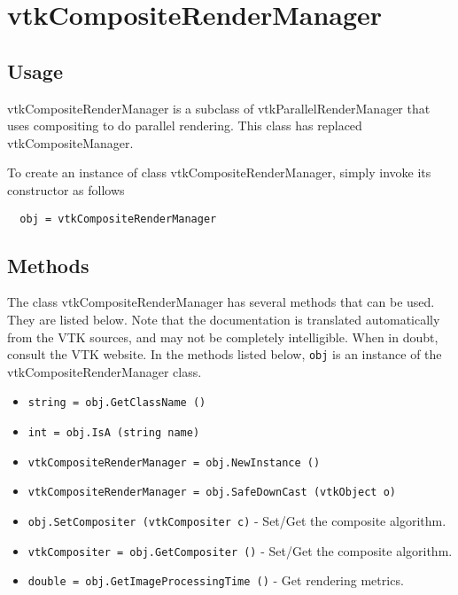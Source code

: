 \section{vtkCompositeRenderManager}

\subsection{Usage}

 vtkCompositeRenderManager is a subclass of vtkParallelRenderManager that
 uses compositing to do parallel rendering.  This class has
 replaced vtkCompositeManager.


To create an instance of class vtkCompositeRenderManager, simply
invoke its constructor as follows
\begin{verbatim}
  obj = vtkCompositeRenderManager
\end{verbatim}
\subsection{Methods}

The class vtkCompositeRenderManager has several methods that can be used.
  They are listed below.
Note that the documentation is translated automatically from the VTK sources,
and may not be completely intelligible.  When in doubt, consult the VTK website.
In the methods listed below, \verb|obj| is an instance of the vtkCompositeRenderManager class.
\begin{itemize}
\item  \verb|string = obj.GetClassName ()|

\item  \verb|int = obj.IsA (string name)|

\item  \verb|vtkCompositeRenderManager = obj.NewInstance ()|

\item  \verb|vtkCompositeRenderManager = obj.SafeDownCast (vtkObject o)|

\item  \verb|obj.SetCompositer (vtkCompositer c)| -  Set/Get the composite algorithm.

\item  \verb|vtkCompositer = obj.GetCompositer ()| -  Set/Get the composite algorithm.

\item  \verb|double = obj.GetImageProcessingTime ()| -  Get rendering metrics.

\end{itemize}
